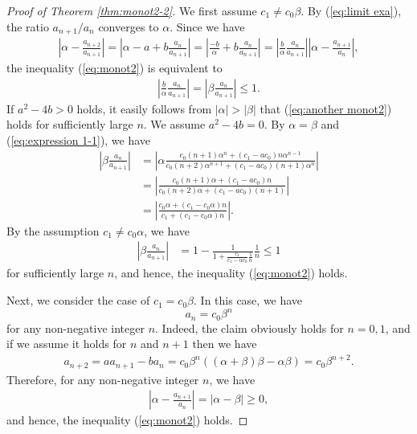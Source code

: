 \documentclass[a4paper,11pt,reqno]{amsart}
\theoremstyle{plain}
\theoremstyle{definition}
\begin{document}
\begin{proof}[Proof of Theorem \ref{thm:monot2-2}]
We first assume $c_{1}\not= c_{0}\beta $. 
By (\ref{eq:limit exa}), the ratio $a_{n+1}/a_{n}$ converges to $\alpha$. 
Since we have 
\begin{align*}
\left|\alpha -\frac{a_{n+2}}{a_{n+1}}\right|
   =
   \left|\alpha -a+b\frac{a_{n}}{a_{n+1}}\right|
   =
   \left|\frac{-b}{\alpha }+b\frac{a_{n}}{a_{n+1}}\right|
   =
   \left|\frac{b}{\alpha }\frac{a_{n}}{a_{n+1}}\right|\left|\alpha -\frac{a_{n+1}}{a_{n}}\right|, 
\end{align*}
the inequality (\ref{eq:monot2}) is equivalent to 
\begin{align}
\label{eq:another monot2}
\left|\frac{b}{\alpha }\frac{a_{n}}{a_{n+1}}\right|
   =
   \left|\beta \frac{a_{n}}{a_{n+1}}\right|
   \leq 1 .
\end{align}
If $a^{2}-4b>0$ holds, it easily follows from $|\alpha |>|\beta |$ that 
(\ref{eq:another monot2}) holds for sufficiently large $n$. 
We assume $a^{2}-4b=0$. 
By $\alpha =\beta $ and (\ref{eq:expression 1-1}), we have 
\begin{align*}
\left|\beta \frac{a_{n}}{a_{n+1}}\right|
   &=
   \left|\alpha \frac{c_{0}(n+1)\alpha ^{n}+(c_{1}-ac_{0})n\alpha ^{n-1}}{c_{0}(n+2)\alpha ^{n+1}+(c_{1}-ac_{0})(n+1)\alpha ^{n}}\right| \\
   &=
   \left|\frac{c_{0}(n+1)\alpha +(c_{1}-ac_{0})n}{c_{0}(n+2)\alpha +(c_{1}-ac_{0})(n+1)}\right| \\
   &=
   \left|\frac{c_{0}\alpha +(c_{1}-c_{0}\alpha )n}{c_{1}+(c_{1}-c_{0}\alpha )n}\right|.
\end{align*}
By the assumption $c_{1}\not= c_{0}\alpha $, we have 
\begin{align*}
\left|\beta \frac{a_{n}}{a_{n+1}}\right|
   &=
   1-\frac{1}{1+\frac{c_{1}}{c_{1}-\alpha c_{0}}\frac{1}{n}}\frac{1}{n}
   \leq 1 
\end{align*}
for sufficiently large $n$, and hence, the inequality (\ref{eq:monot2}) holds. 

Next, we consider the case of $c_{1}= c_{0}\beta $. 
In this case, we have 
$$
a_{n}=c_{0}\beta ^{n}
$$
for any non-negative integer $n$. 
Indeed, the claim obviously holds for $n=0,1$, and if we assume it holds for $n$ and $n+1$ then we have 
\begin{align*}
a_{n+2}
   =
   aa_{n+1}-ba_{n}
   =
   c_{0}\beta ^{n}((\alpha +\beta )\beta -\alpha \beta )
   =
   c_{0}\beta ^{n+2}.
\end{align*}
Therefore, for any non-negative integer $n$, we have 
\begin{align*}
\left|\alpha -\frac{a_{n+1}}{a_{n}}\right|
   =
   \left|\alpha -\beta \right|\geq 0,
\end{align*}
and hence, the inequality (\ref{eq:monot2}) holds. 
\end{proof}
\end{document}
